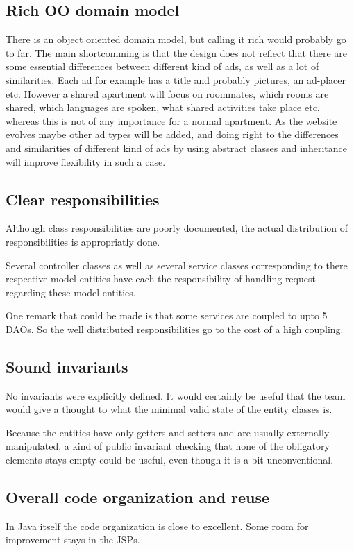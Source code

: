 \documentclass[a4wide]{article}
\begin{document}
\subsection{Rich OO domain model}
There is an object oriented domain model, but calling it rich would probably go to far. The main shortcomming is that the design does not reflect that there are some essential differences between different kind of ads, as well as a lot of similarities. Each ad for example has a title and probably pictures, an ad-placer etc. However a shared apartment will focus on roommates, which rooms are shared, which languages are spoken, what shared activities take place etc. whereas this is not of any importance for a normal apartment. As the website evolves maybe other ad types will be added, and doing right to the differences and similarities of different kind of ads by using abstract classes and inheritance will improve flexibility in such a case.
\subsection{Clear responsibilities}
Although class responsibilities are poorly documented, the actual distribution of responsibilities is appropriatly done.

Several controller classes as well as several service classes corresponding to there respective model entities have each the responsibility of handling request regarding these model entities. 

One remark that could be made is that some services are coupled to upto 5 DAOs. So the well distributed responsibilities go to the cost of a high coupling. 
\subsection{Sound invariants}
No invariants were explicitly defined. It would certainly be useful that the team would give a thought to what the minimal valid state of the entity classes is. 

Because the entities have only getters and setters and are usually externally manipulated, a kind of public invariant checking that none of the obligatory elements stays empty could be useful, even though it is a bit unconventional.
\subsection{Overall code organization and reuse}
In Java itself the code organization is close to excellent. Some room for improvement stays in the JSPs. 
\end{document}
